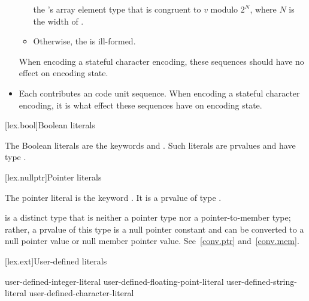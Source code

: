 \begin{itemize}
\begin{itemize}
the 's array element type 
that is congruent to $v$ modulo $2^N$, where $N$ is the width of .
\item
Otherwise, the  is ill-formed.
\end{itemize}
When encoding a stateful character encoding,
these sequences should have no effect on encoding state.
\item
Each 
contributes an
code unit sequence.
When encoding a stateful character encoding,
it is
what effect these sequences have on encoding state.
\end{itemize}

[lex.bool]{Boolean literals}

%
\begin{bnf}
\br
    \br
\end{bnf}

\pnum
{}%
The Boolean literals are the keywords  and .
Such literals are prvalues and have type .

[lex.nullptr]{Pointer literals}

%
\begin{bnf}
\br
\end{bnf}

\pnum
The pointer literal is the keyword . It is a prvalue of type
.
\begin{note}
 is a distinct type that is neither a pointer type nor a pointer-to-member type;
rather, a prvalue of this type is a null pointer constant and can be
converted to a null pointer value or null member pointer value. See~\ref{conv.ptr}
and~\ref{conv.mem}.
\end{note}

[lex.ext]{User-defined literals}

%
\begin{bnf}
\br
    user-defined-integer-literal\br
    user-defined-floating-point-literal\br
    user-defined-string-literal\br
    user-defined-character-literal
\end{bnf}

